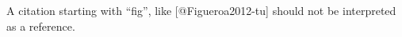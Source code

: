 A citation starting with ``fig'', like {[}@Figueroa2012-tu{]} should not
be interpreted as a reference.
